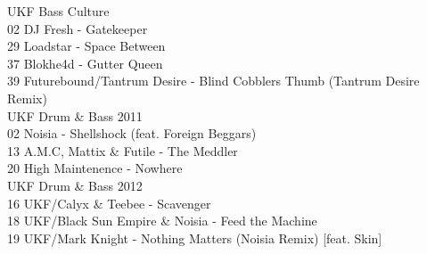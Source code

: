 \begin{multicols}{2}
 \large UKF Bass Culture \normalsize\\
 02 DJ Fresh - Gatekeeper\\ 29 Loadstar - Space Between\\ 37 Blokhe4d - Gutter Queen\\ 39 Futurebound/Tantrum Desire - Blind Cobblers Thumb (Tantrum Desire Remix)\\
 \large UKF Drum \& Bass 2011 \normalsize\\
 02 Noisia - Shellshock (feat. Foreign Beggars)\\ 13 A.M.C, Mattix \& Futile - The Meddler\\ 20 High Maintenence - Nowhere\\
 \large UKF Drum \& Bass 2012 \normalsize\\
 16 UKF/Calyx \& Teebee - Scavenger\\ 18 UKF/Black Sun Empire \& Noisia - Feed the Machine\\ 19 UKF/Mark Knight - Nothing Matters (Noisia Remix) [feat. Skin]\\
\\

\end{multicols}

